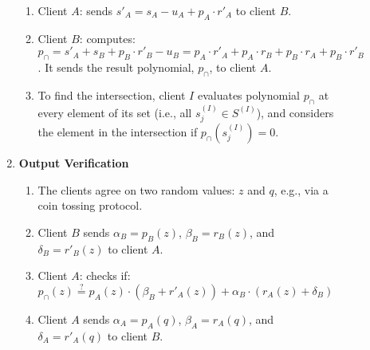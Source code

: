 \begin{figure}[ht]
\begin{center}
\begin{boxedminipage}{12.3cm}
\begin{enumerate}
\begin{enumerate}
\item\label{gen-s-A-prime} Client $A$: sends $s'_{\scriptscriptstyle A}=s_{\scriptscriptstyle A}-u_{\scriptscriptstyle A}+p_{\scriptscriptstyle A}\cdot r'_{\scriptscriptstyle A}$ to client $B$.%
\item \label{where-clientB-deviates1}Client $B$: computes: $p_{\scriptscriptstyle \cap}=s'_{\scriptscriptstyle A}+s_{\scriptscriptstyle B}+p_{\scriptscriptstyle B}\cdot r'_{\scriptscriptstyle B}-u_{\scriptscriptstyle B}  =  p_{\scriptscriptstyle A}\cdot r'_{\scriptscriptstyle A}+p_{\scriptscriptstyle A}\cdot r_{\scriptscriptstyle B}+p_{\scriptscriptstyle B}\cdot r_{\scriptscriptstyle A}+p_{\scriptscriptstyle B}\cdot r'_{\scriptscriptstyle B}$. It sends the result polynomial, $p_{\scriptscriptstyle \cap}$, to client $A$.

\item\label{two-party-psi:find-intersect}  To find the intersection, client $I$  evaluates  polynomial $p_{\scriptscriptstyle \cap}$ at every element of its set (i.e., all $s^{\scriptscriptstyle (I)}_{\scriptscriptstyle j}\in S^{\scriptscriptstyle (I)}$), and considers the element in the intersection if  $p_{\scriptscriptstyle \cap}(s^{\scriptscriptstyle (I)}_{\scriptscriptstyle j})=0$.  

\end{enumerate}
\item  \textbf{Output Verification}
\begin{enumerate}
\item\label{two-party-PSI::agree-on-random-vals} The clients agree on two random values: $z$ and $q$, e.g., via a coin tossing protocol. 

\item\label{where-clientB-deviates2} Client $B$ sends $\alpha_{\scriptscriptstyle B}=p_{\scriptscriptstyle B}(z)$, $\beta_{\scriptscriptstyle B}=r_{\scriptscriptstyle B}(z)$, and $\delta_{\scriptscriptstyle B}=r'_{\scriptscriptstyle B}(z)$ to client $A$.

\item\label{checks-on-computingPSI} Client $A$:  checks if:   $p_{\cap}(z)\stackrel{?}=p_{\scriptscriptstyle A}(z)\cdot(\beta_{\scriptscriptstyle B}+r'_{\scriptscriptstyle A}(z))+\alpha_{\scriptscriptstyle B}\cdot(r_{\scriptscriptstyle A}(z)+\delta_{\scriptscriptstyle B})$

\item\label{two-party-PSI::what-A-sends-in-ver}  Client $A$ sends $\alpha_{\scriptscriptstyle A}=p_{\scriptscriptstyle A}(q)$, $\beta_{\scriptscriptstyle A}=r_{\scriptscriptstyle A}(q)$, and $\delta_{\scriptscriptstyle A}=r'_{\scriptscriptstyle A}(q)$ to client $B$.


\end{enumerate}
\end{enumerate}
\end{boxedminipage}
\end{center}
\end{figure}
